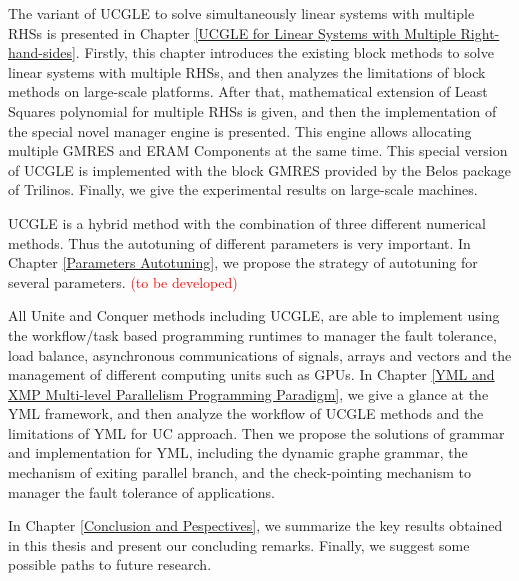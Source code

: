 The variant of UCGLE to solve simultaneously linear systems with multiple RHSs is presented in Chapter \ref{UCGLE for Linear Systems with Multiple Right-hand-sides}. Firstly, this chapter introduces the existing block methods to solve linear systems with multiple RHSs, and then analyzes the limitations of block methods on large-scale platforms. After that, mathematical extension of Least Squares polynomial for multiple RHSs is given, and then the implementation of the special novel manager engine is presented. This engine allows allocating multiple GMRES and ERAM Components at the same time. This special version of UCGLE is implemented with the block GMRES provided by the Belos package of Trilinos. Finally, we give the experimental results on large-scale machines.

UCGLE is a hybrid method with the combination of three different numerical methods. Thus the autotuning of different parameters is very important. In Chapter \ref{Parameters Autotuning}, we propose the strategy of autotuning for several parameters. \textcolor{red}{(to be developed)}

All Unite and Conquer methods including UCGLE, are able to implement using the workflow/task based programming runtimes to manager the fault tolerance, load balance, asynchronous communications of signals, arrays and vectors and the management of different computing units such as GPUs. In Chapter \ref{YML and XMP Multi-level Parallelism Programming Paradigm}, we give a glance at the YML framework, and then analyze the workflow of UCGLE methods and the limitations of YML for UC approach. Then we propose the solutions of grammar and implementation for YML, including the dynamic graphe grammar, the mechanism of exiting parallel branch, and the check-pointing mechanism to manager the fault tolerance of applications.

In Chapter \ref{Conclusion and Pespectives}, we summarize the key results obtained in this thesis and present our concluding remarks. Finally, we suggest some possible paths to future research.
